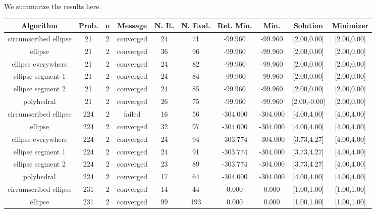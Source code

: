 We summarize the results here.
\begin{tiny}

\begin{center}
\begin{longtable}{ c c c c c c c c c c }
Algorithm & Prob. & n & Message & N. It. & N. Eval. & Ret. Min. & Min. & Solution & Minimizer \\
\hline
  circumscribed ellipse   &   21  &  2  & converged  &   24  &   71  &  -99.960   &  -99.960   & [2.00,0.00] & [2.00,0.00] \\
         ellipse          &   21  &  2  & converged  &   36  &   96  &  -99.960   &  -99.960   & [2.00,0.00] & [2.00,0.00] \\
    ellipse everywhere    &   21  &  2  & converged  &   24  &   82  &  -99.960   &  -99.960   & [2.00,0.00] & [2.00,0.00] \\
    ellipse segment 1     &   21  &  2  & converged  &   24  &   84  &  -99.960   &  -99.960   & [2.00,0.00] & [2.00,0.00] \\
    ellipse segment 2     &   21  &  2  & converged  &   24  &   85  &  -99.960   &  -99.960   & [2.00,0.00] & [2.00,0.00] \\
        polyhedral        &   21  &  2  & converged  &   26  &   75  &  -99.960   &  -99.960   & [2.00,-0.00] & [2.00,0.00] \\
  circumscribed ellipse   &  224  &  2  &   failed   &   16  &   56  &  -304.000  &  -304.000  & [4.00,4.00] & [4.00,4.00] \\
         ellipse          &  224  &  2  & converged  &   32  &   97  &  -304.000  &  -304.000  & [4.00,4.00] & [4.00,4.00] \\
    ellipse everywhere    &  224  &  2  & converged  &   24  &   94  &  -303.774  &  -304.000  & [3.73,4.27] & [4.00,4.00] \\
    ellipse segment 1     &  224  &  2  & converged  &   24  &   91  &  -303.774  &  -304.000  & [3.73,4.27] & [4.00,4.00] \\
    ellipse segment 2     &  224  &  2  & converged  &   23  &   89  &  -303.774  &  -304.000  & [3.73,4.27] & [4.00,4.00] \\
        polyhedral        &  224  &  2  & converged  &   17  &   64  &  -304.000  &  -304.000  & [4.00,4.00] & [4.00,4.00] \\
  circumscribed ellipse   &  231  &  2  & converged  &   14  &   44  &   0.000    &   0.000    & [1.00,1.00] & [1.00,1.00] \\
         ellipse          &  231  &  2  & converged  &   99  &  193  &   0.000    &   0.000    & [1.00,1.00] & [1.00,1.00] \\

\end{longtable}
\end{center}
\end{tiny}

